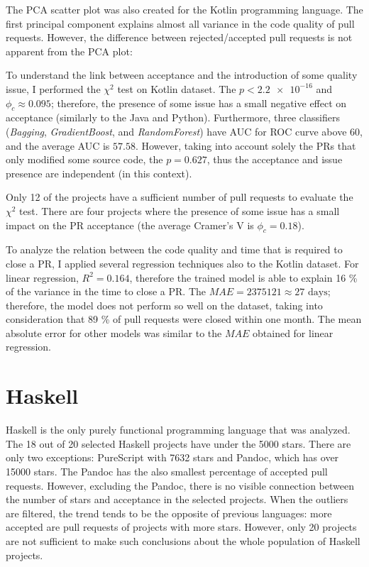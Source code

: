 \documentclass[digital,oneside,oldtable,nolof,nolot,nocover]{fithesis4}
\begin{document}
The PCA scatter plot was also created for the Kotlin programming language.
The first principal component explains almost all variance in the code quality of pull requests.
However, the difference between rejected/accepted pull requests is not apparent from the PCA plot:

To understand the link between acceptance and the introduction of some
quality issue, I performed the \(\chi^2\) test on Kotlin dataset. The \(p < \num{2.2e-16}\) and
\(\phi_c \approx 0.095\); therefore, the presence of some issue has a small
negative effect on acceptance (similarly to the Java and Python).
Furthermore, three classifiers (\emph{Bagging}, \emph{GradientBoost}, and \emph{RandomForest})
have AUC for ROC curve above 60, and the average AUC is \(57.58\).
However, taking into account solely the PRs that only modified some source
code, the \(p = 0.627\), thus the acceptance and issue presence are independent
(in this context).

Only 12 of the projects have a sufficient number of pull requests to evaluate
the \(\chi^2\) test. There are four projects where the presence of some issue
has a small impact on the PR acceptance (the average Cramer's V is \(\phi_c = 0.18\)).

To analyze the relation between the code quality and time that is required to
close a PR, I applied several regression techniques also to the Kotlin
dataset.  For linear regression, \(R^2 = 0.164\), therefore the trained model is
able to explain 16 \% of the variance in the time to close a PR. The \(MAE =
   2375121 \approx 27\text{ days}\); therefore, the model does not perform so well
on the dataset, taking into consideration that 89 \% of pull requests were
closed within one month. The mean absolute error for other models was similar
to the \(MAE\) obtained for linear regression.
\section{Haskell}
\label{sec:org317a0fd}
Haskell is the only purely functional programming language that was analyzed.
The 18 out of 20 selected Haskell projects have under the 5000 stars. There
are only two exceptions: PureScript with 7632 stars and Pandoc, which has over
15000 stars. The Pandoc has the also smallest percentage of accepted pull
requests.  However, excluding the Pandoc, there is no visible connection
between the number of stars and acceptance in the selected projects. When the
outliers are filtered, the trend tends to be the opposite of previous languages:
more accepted are pull requests of projects with more stars.  However, only
20 projects are not sufficient to make such conclusions about the whole
population of Haskell projects.
\end{document}
